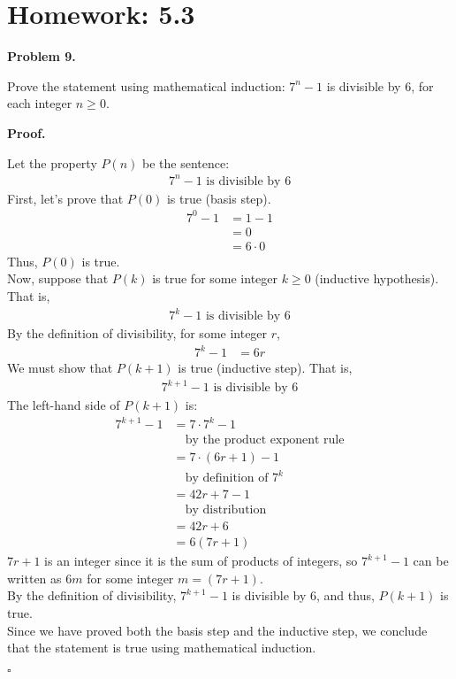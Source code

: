 \documentclass{article}
\newenvironment{problem}[1]{
    \begin{mdframed}[backgroundcolor=gray!20, skipabove=\baselineskip, skipbelow=\baselineskip, nobreak=true, innerleftmargin=10pt, innerrightmargin=10pt, innertopmargin=10pt, innerbottommargin=10pt]
    \textbf{Problem #1.}
}{
    \end{mdframed}
}
\newenvironment{proof}{
    \begin{mdframed}[nobreak=false, innerleftmargin=10pt, innerrightmargin=10pt, innertopmargin=10pt, innerbottommargin=10pt]
    \textbf{Proof.}
}{
    \hfill $\square$
    \end{mdframed}
}
\begin{document}
\section{Homework: 5.3}
    \begin{problem}{9}
        Prove the statement using mathematical induction: $7^n - 1$ is divisible by $6$, for each integer $n \geq 0$.
    \end{problem}
    \begin{proof}
        Let the property $P(n)$ be the sentence:
        \begin{align*}
            7^n - 1 \text{ is divisible by } 6
        \end{align*}
        First, let's prove that $P(0)$ is true (basis step).
        \begin{align*}
            7^0 - 1 &= 1 -1 \\
            &= 0 \\
            &= 6 \cdot 0
        \end{align*}
        Thus, $P(0)$ is true. \\
        Now, suppose that $P(k)$ is true for some integer $k \geq 0$ (inductive hypothesis). That is,
        \begin{align*}
            7^k - 1 \text{ is divisible by } 6
        \end{align*}
        By the definition of divisibility, for some integer $r$,
        \begin{align*}
            7^k - 1 &= 6r
        \end{align*}
        We must show that $P(k+1)$ is true (inductive step). That is,
        \begin{align*}
            7^{k+1} - 1 \text{ is divisible by } 6
        \end{align*}
        The left-hand side of $P(k+1)$ is:
        \begin{align*}
            7^{k+1} - 1 &= 7 \cdot 7^k - 1 \\
            & \quad \text{by the product exponent rule} \\
            &= 7 \cdot (6r + 1) - 1 \\
            & \quad \text{by definition of $7^k$} \\
            &= 42r + 7 - 1 \\
            & \quad \text{by distribution} \\
            &= 42r + 6 \\
            &= 6(7r + 1)
        \end{align*}
        $7r + 1$ is an integer since it is the sum of products of integers, so $7^{k+1} - 1$ can be written as $6m$ for some integer $m = (7r + 1)$. \\
        By the definition of divisibility, $7^{k+1} - 1$ is divisible by $6$, and thus, $P(k+1)$ is true. \\
        Since we have proved both the basis step and the inductive step, we conclude that the statement is true using mathematical induction.
    \end{proof}
\end{document}
